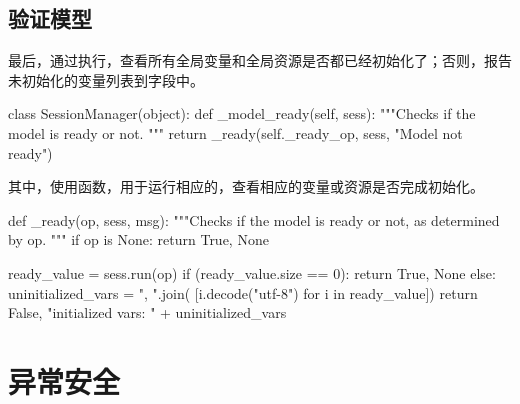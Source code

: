 \begin{content}
\subsection{验证模型}

最后，通过执行，查看所有全局变量和全局资源是否都已经初始化了；否则，报告未初始化的变量列表到字段中。

\begin{leftbar}
\begin{python}
class SessionManager(object):
  def _model_ready(self, sess):
    """Checks if the model is ready or not.
    """
    return _ready(self._ready_op, sess, "Model not ready")
\end{python}
\end{leftbar}

其中，使用函数，用于运行相应的，查看相应的变量或资源是否完成初始化。

\begin{leftbar}
\begin{python}
def _ready(op, sess, msg):
  """Checks if the model is ready or not, as determined by op.
  """
  if op is None:
    return True, None

  ready_value = sess.run(op)
  if (ready_value.size == 0):
    return True, None
  else:
    uninitialized_vars = ", ".join(
        [i.decode("utf-8") for i in ready_value])
    return False, "initialized vars: " + uninitialized_vars
\end{python}
\end{leftbar}

\end{content}

\section{异常安全}

